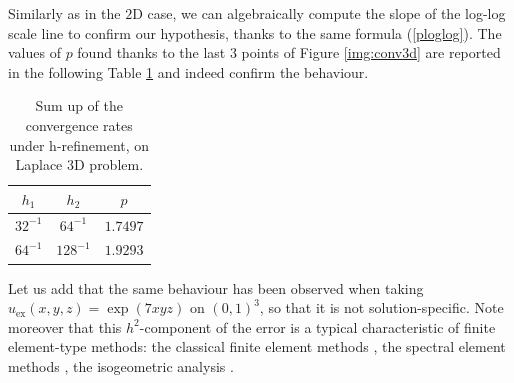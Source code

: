 Similarly as in the $2$D case, we can algebraically compute the slope of the log-log scale line to confirm our hypothesis, thanks to the same formula (\ref{ploglog}). The values of $p$ found thanks to the last $3$ points of Figure \ref{img:conv3d} are reported in the following Table \ref{tableCube} and indeed confirm the behaviour.
\begin{table}[h!]
\begin{center}
\begin{tabular}{|c|c|c|}
\hline
$h_1$ & $h_2$ & $p$ \\
\hline
$32^{-1}$ & $64^{-1}$ & $1.7497$\\
\hline
$64^{-1}$ & $128^{-1}$ & $1.9293$\\
\hline
\end{tabular}
\end{center}
\caption{Sum up of the convergence rates under h-refinement, on Laplace $3$D problem.} \label{tableCube}
\end{table}

Let us add that the same behaviour has been observed when taking $u_\text{ex}(x,y,z)=\exp(7xyz)$ on $(0,1)^3$, so that it is not solution-specific. 
Note moreover that this $h^2$-component of the error is a typical characteristic of finite element-type methods: the classical finite element methods \cite{quarteroni}, the spectral element methods \cite{chqz1}, the isogeometric analysis \cite{igaconv}.
